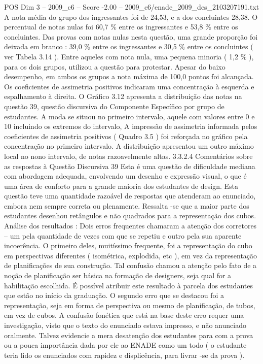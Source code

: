 \begin{textsample}{POS Dim 3 – 2009\_c6 – Score -2.00 – 2009\_c6/enade\_2009\_des\_2103207191.txt}
A nota média do grupo dos ingressantes foi de 24,53, e a dos concluintes 28,38.
O percentual de notas nulas foi 60,7 \% entre os ingressantes e 53,8 \% entre os concluintes.
Das provas com notas nulas nesta questão, uma grande proporção foi deixada em branco : 39,0 \% entre os ingressantes e 30,5 \% entre os concluintes ( ver Tabela 3.14 ).
Entre aqueles com nota nula, uma pequena minoria ( 1,2 \% ), para os dois grupos, utilizou a questão para protestar.
Apesar do baixo desempenho, em ambos os grupos a nota máxima de 100,0 pontos foi alcançada.
Os coeficientes de assimetria positivos indicaram uma concentração à esquerda e espalhamento à direita.
O Gráfico 3.12 apresenta a distribuição das notas na questão 39, questão discursiva do Componente Específico por grupo de estudantes.
A moda se situou no primeiro intervalo, aquele com valores entre 0 e 10 incluindo os extremos do intervalo, A impressão de assimetria informada pelos coeficientes de assimetria positivos ( Quadro 3.5 ) foi reforçada no gráfico pela concentração no primeiro intervalo.
A distribuição apresentou um outro máximo local no nono intervalo, de notas razoavelmente altas. 3.3.2.4 Comentários sobre as respostas à Questão Discursiva 39 Esta é uma questão de dificuldade mediana com abordagem adequada, envolvendo um desenho e expressão visual, o que é uma área de conforto para a grande maioria dos estudantes de design.
Esta questão teve uma quantidade razoável de respostas que atenderam ao enunciado, embora nem sempre correta ou plenamente.
Ressalta -se que a maior parte dos estudantes desenhou retângulos e não quadrados para a representação dos cubos.
Análise dos resultados : Dois erros frequentes chamaram a atenção dos corretores – um pela quantidade de vezes com que se repetiu e outro pela sua aparente incoerência.
O primeiro deles, muitíssimo frequente, foi a representação do cubo em perspectivas diferentes ( isométrica, explodida, etc ), em vez da representação de planificações de sua construção.
Tal confusão chamou a atenção pelo fato de a noção de planificação ser básica na formação de designers, seja qual for a habilitação escolhida.
É possível atribuir este resultado à parcela dos estudantes que estão no início da graduação.
O segundo erro que se destacou foi a representação, seja em forma de perspectiva ou mesmo de planificação, de tubos, em vez de cubos.
A confusão fonética que está na base deste erro requer uma investigação, visto que o texto do enunciado estava impresso, e não anunciado oralmente.
Talvez evidencie a mera desatenção dos estudantes para com a prova ou a pouca importância dada por ele ao ENADE como um todo ( o estudante teria lido os enunciados com rapidez e displicência, para livrar -se da prova ).

\end{textsample}
